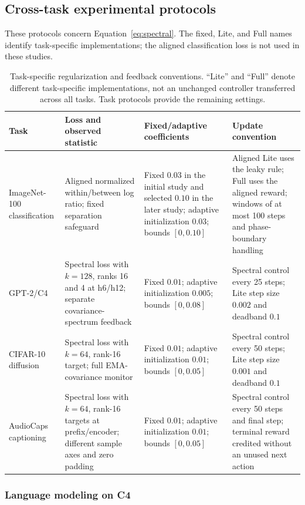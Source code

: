 \documentclass[10pt,a4paper,twocolumn]{article}
\begin{document}
\subsection{Cross-task experimental protocols}\label{sec:cross_protocols}
These protocols concern Equation~\eqref{eq:spectral}. The fixed, Lite,
and Full names identify task-specific implementations; the aligned
classification loss is not used in these studies.
\begin{table}[tbp]
\caption{Task-specific regularization and feedback conventions.
``Lite'' and ``Full'' denote different task-specific implementations,
not an unchanged controller transferred across all tasks.
Task protocols provide the remaining settings.}
\label{tab:control_variants}
\centering\small
\begin{tabularx}{\textwidth}{@{}p{}YYY@{}}
\toprule
Task & Loss and observed statistic & Fixed/adaptive coefficients &
Update convention \\
\midrule
ImageNet-100 classification &
Aligned normalized within/between log ratio; fixed separation safeguard &
Fixed $0.03$ in the initial study and selected $0.10$ in the later study;
adaptive initialization $0.03$; bounds $[0,0.10]$ &
Aligned Lite uses the leaky rule; Full uses the aligned reward;
windows of at most 100 steps and phase-boundary handling \\
GPT-2/C4 &
Spectral loss with $k=128$, ranks 16 and 4 at h6/h12;
separate covariance-spectrum feedback &
Fixed $0.01$; adaptive initialization $0.005$;
bounds $[0,0.08]$ &
Spectral control every 25 steps;
Lite step size $0.002$ and deadband $0.1$ \\
CIFAR-10 diffusion &
Spectral loss with $k=64$, rank-16 target;
full EMA-covariance monitor &
Fixed $0.01$; adaptive initialization $0.01$;
bounds $[0,0.05]$ &
Spectral control every 50 steps;
Lite step size $0.001$ and deadband $0.1$ \\
AudioCaps captioning &
Spectral loss with $k=64$, rank-16 targets at prefix/encoder;
different sample axes and zero padding &
Fixed $0.01$; adaptive initialization $0.01$;
bounds $[0,0.05]$ &
Spectral control every 50 steps and final step;
terminal reward credited without an unused next action \\
\bottomrule
\end{tabularx}
\end{table}

\subsubsection{Language modeling on C4}
\label{sec:c4_setup}
\end{document}
